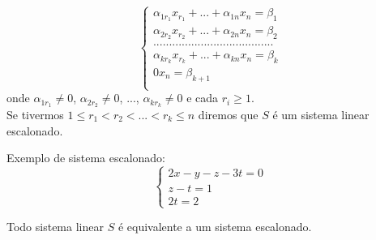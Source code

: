 \begin{equation*}
\begin{cases}
\alpha_{1r_{1}}x_{r_{1}}+...+\alpha_{1n}x_{n}=\beta_{1}\\
\alpha_{2r_{2}}x_{r_{2}}+...+\alpha_{2n}x_{n}=\beta_{2}\\
......................................\\
\alpha_{kr_{k}}x_{r_{k}}+...+\alpha_{kn}x_{n}=\beta_{k}\\
0x_{n}=\beta_{k+1}\\
\end{cases}
\end{equation*} 
onde $\alpha_{1r_{1}}\neq 0$, $\alpha_{2r_{2}}\neq 0$, ..., $\alpha_{kr_{k}}\neq 0$ e cada $r_{i}\geq 1$.\\
Se tivermos $1\leq r_{1}<r_{2}<...<r_{k}\leq n$ diremos que $S$ é um sistema linear escalonado. 
\begin{ex}
	Exemplo de sistema escalonado:\\
	\begin{equation*}
	\begin{cases}
	2x-y-z-3t=0 \\
	z-t=1\\
	2t=2
	\end{cases}
	\end{equation*} 
\end{ex}
\begin{teo}
Todo sistema linear $S$ é equivalente a um sistema escalonado.	
\end{teo}
